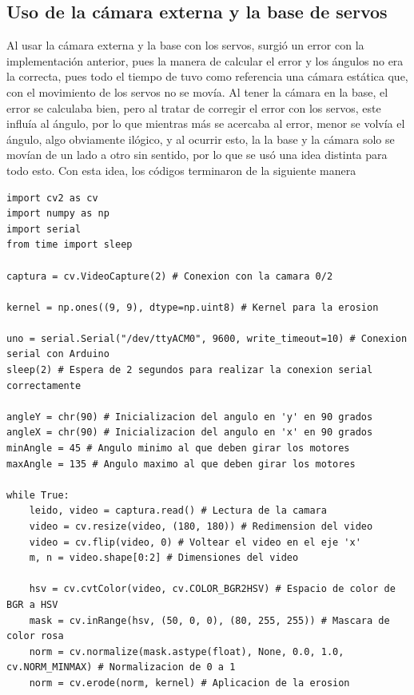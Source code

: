 \documentclass[12pt, oneside]{article}
\begin{document}
\subsection{Uso de la cámara externa y la base de servos}
{\sffamily\normalsize\justify
    \hspace{0.5cm} Al usar la cámara externa y la base con los servos, surgió un error
    con la implementación anterior, pues la manera de calcular el error y los ángulos
    no era la correcta, pues todo el tiempo de tuvo como referencia una cámara estática
    que, con el movimiento de los servos no se movía. Al tener la cámara en la base, el
    error se calculaba bien, pero al tratar de corregir el error con los servos, este
    influía al ángulo, por lo que mientras más se acercaba al error, menor se volvía el
    ángulo, algo obviamente ilógico, y al ocurrir esto, la la base y la cámara solo se
    movían de un lado a otro sin sentido, por lo que se usó una idea distinta para todo
    esto. Con esta idea, los códigos terminaron de la siguiente manera

    \begin{lstlisting}[style=pythonScript]
import cv2 as cv
import numpy as np
import serial
from time import sleep

captura = cv.VideoCapture(2) # Conexion con la camara 0/2

kernel = np.ones((9, 9), dtype=np.uint8) # Kernel para la erosion

uno = serial.Serial("/dev/ttyACM0", 9600, write_timeout=10) # Conexion serial con Arduino
sleep(2) # Espera de 2 segundos para realizar la conexion serial correctamente

angleY = chr(90) # Inicializacion del angulo en 'y' en 90 grados
angleX = chr(90) # Inicializacion del angulo en 'x' en 90 grados
minAngle = 45 # Angulo minimo al que deben girar los motores
maxAngle = 135 # Angulo maximo al que deben girar los motores

while True:
    leido, video = captura.read() # Lectura de la camara
    video = cv.resize(video, (180, 180)) # Redimension del video
    video = cv.flip(video, 0) # Voltear el video en el eje 'x'
    m, n = video.shape[0:2] # Dimensiones del video

    hsv = cv.cvtColor(video, cv.COLOR_BGR2HSV) # Espacio de color de BGR a HSV
    mask = cv.inRange(hsv, (50, 0, 0), (80, 255, 255)) # Mascara de color rosa
    norm = cv.normalize(mask.astype(float), None, 0.0, 1.0, cv.NORM_MINMAX) # Normalizacion de 0 a 1
    norm = cv.erode(norm, kernel) # Aplicacion de la erosion


\end{lstlisting}}
\end{document}
